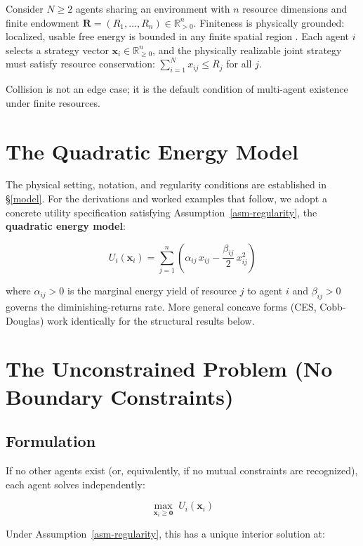 \documentclass[11pt]{article}
\theoremstyle{plain}
\theoremstyle{definition}
\theoremstyle{remark}
\let\origsection\section
\renewcommand{\section}{\needspace{12\baselineskip}\origsection}
\let\origsubsection\subsection
\renewcommand{\subsection}{\needspace{7\baselineskip}\origsubsection}
\begin{document}
Consider \(N \geq 2\) agents sharing an environment with \(n\) resource
dimensions and finite endowment
\(\mathbf{R} = (R_1, \ldots, R_n) \in \mathbb{R}_{>0}^n\). Finiteness is
physically grounded: localized, usable free energy is bounded in any
finite spatial region \citep{Penrose2005}. Each agent \(i\) selects a
strategy vector \(\mathbf{x}_i \in \mathbb{R}_{\geq 0}^n\), and the
physically realizable joint strategy must satisfy resource conservation:
\(\sum_{i=1}^N x_{ij} \leq R_j\) for all \(j\).

Collision is not an edge case; it is the default condition of
multi-agent existence under finite resources.

\section{The Quadratic Energy Model}\label{the-quadratic-energy-model}

The physical setting, notation, and regularity conditions are
established in §\ref{model}. For the derivations and worked examples
that follow, we adopt a concrete utility specification satisfying
Assumption~\ref{asm-regularity}, the \textbf{quadratic energy model}:

\[U_i(\mathbf{x}_i) = \sum_{j=1}^{n} \left( \alpha_{ij} \, x_{ij} - \frac{\beta_{ij}}{2} \, x_{ij}^2 \right)\]

where \(\alpha_{ij} > 0\) is the marginal energy yield of resource \(j\)
to agent \(i\) and \(\beta_{ij} > 0\) governs the diminishing-returns
rate. More general concave forms (CES, Cobb-Douglas) work identically
for the structural results below.

\section{The Unconstrained Problem (No Boundary
Constraints)}\label{the-unconstrained-problem-no-boundary-constraints}

\subsection{Formulation}\label{formulation}

If no other agents exist (or, equivalently, if no mutual constraints are
recognized), each agent solves independently:

\[\max_{\mathbf{x}_i \geq \mathbf{0}} \; U_i(\mathbf{x}_i)\]

Under Assumption~\ref{asm-regularity}, this has a unique interior
solution at:
\end{document}
